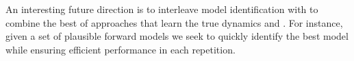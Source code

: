 An interesting future direction is to interleave model identification
with \cmaxpp{} to combine the best of approaches that learn the true
dynamics and \cmaxpp{}. For instance, given a set of plausible forward
models we seek to quickly identify the best model while ensuring efficient
performance in each repetition.

